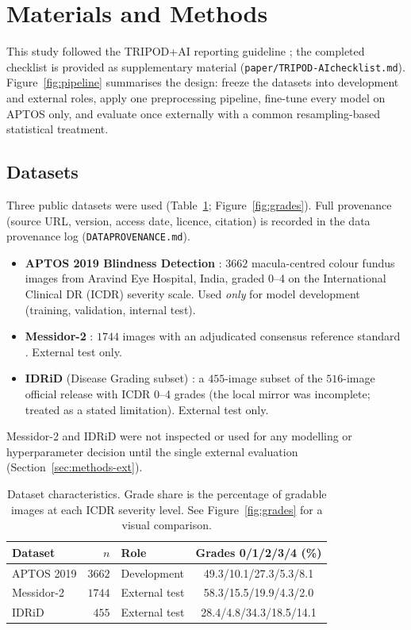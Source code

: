 \documentclass[journal]{IEEEtran}
\renewcommand{\_}{\origunderscore\allowbreak}
\begin{document}
\section{Materials and Methods}
\label{sec:methods}

This study followed the TRIPOD+AI reporting guideline \cite{tripodai2024}; the
completed checklist is provided as supplementary material
(\texttt{paper/\allowbreak{}TRIPOD-AI\_checklist.md}). Figure~\ref{fig:pipeline} summarises the
design: freeze the datasets into development and external roles, apply one
preprocessing pipeline, fine-tune every model on APTOS only, and evaluate once
externally with a common resampling-based statistical treatment.

\subsection{Datasets}
\label{sec:methods-data}

Three public datasets were used (Table~\ref{tab:datasets};
Figure~\ref{fig:grades}). Full provenance (source URL, version, access date,
licence, citation) is recorded in the data provenance log
(\texttt{DATA\_PROVENANCE.md}).

\begin{itemize}
  \item \textbf{APTOS 2019 Blindness Detection} \cite{aptos2019}: $3662$
    macula-centred colour fundus images from Aravind Eye Hospital, India, graded
    0--4 on the International Clinical DR (ICDR) severity scale. Used
    \emph{only} for model development (training, validation, internal test).
  \item \textbf{Messidor-2} \cite{decenciere2014,abramoff2013}: $1744$ images
    with an adjudicated consensus reference standard \cite{krause2018}. External
    test only.
  \item \textbf{IDRiD} (Disease Grading subset) \cite{porwal2018,porwal2020}: a
    $455$-image subset of the $516$-image official release with ICDR 0--4 grades
    (the local mirror was incomplete; treated as a stated limitation). External
    test only.
\end{itemize}

Messidor-2 and IDRiD were not inspected or used for any modelling or
hyperparameter decision until the single external evaluation
(Section~\ref{sec:methods-ext}).

\begin{table}[!t]
\centering\small
\caption{Dataset characteristics. Grade share is the percentage of gradable
images at each ICDR severity level. See Figure~\ref{fig:grades} for a visual
comparison.}
\label{tab:datasets}
\setlength{\tabcolsep}{3pt}
\begin{tabular}{lrlc}
\toprule
Dataset & $n$ & Role & Grades 0/1/2/3/4 (\%) \\
\midrule
APTOS 2019 & $3662$ & Development   & 49.3/10.1/27.3/5.3/8.1 \\
Messidor-2 & $1744$ & External test & 58.3/15.5/19.9/4.3/2.0 \\
IDRiD      & $455$  & External test & 28.4/4.8/34.3/18.5/14.1 \\
\bottomrule
\end{tabular}
\end{table}
\end{document}
